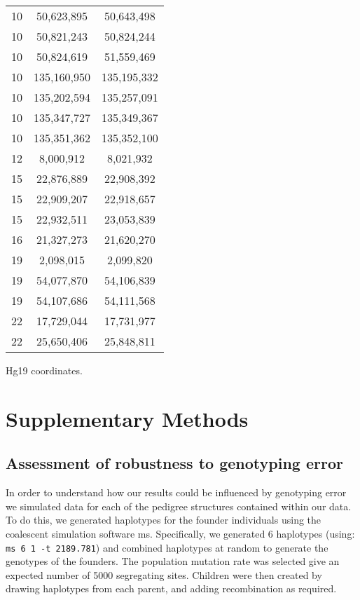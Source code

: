 \begin{table}[!h]
\begin{tabular}{|ccc|}
10 & 50,623,895 & 50,643,498 \\
10 & 50,821,243 & 50,824,244 \\
10 & 50,824,619 & 51,559,469 \\
10 & 135,160,950 & 135,195,332 \\
10 & 135,202,594 & 135,257,091 \\
10 & 135,347,727 & 135,349,367 \\
10 & 135,351,362 & 135,352,100 \\
12 & 8,000,912 & 8,021,932 \\
15 & 22,876,889 & 22,908,392 \\
15 & 22,909,207 & 22,918,657 \\
15 & 22,932,511 & 23,053,839 \\
16 & 21,327,273 & 21,620,270 \\
19 & 2,098,015 & 2,099,820 \\
19 & 54,077,870 & 54,106,839 \\
19 & 54,107,686 & 54,111,568 \\
22 & 17,729,044 & 17,731,977 \\
22 & 25,650,406 & 25,848,811 \\
    \hline \end{tabular}
     {
            Hg19 coordinates.  
    \label{tab:cointTS8}}
\end{table}

\clearpage

\section{Supplementary Methods}

\subsection{Assessment of robustness to genotyping error}

In order to understand how our results could be influenced by genotyping  
error we simulated data for each of the pedigree structures contained within our  
data.  To do this, we generated haplotypes for the founder individuals using the  
coalescent simulation software ms\cite{Hudson2002}.  Specifically, we generated 6 haplotypes (using:  
\verb|ms 6 1 -t 2189.781|) and combined haplotypes at random to generate the genotypes  
of the founders.  The population mutation rate was selected give an expected  
number of 5000 segregating sites. Children were then created by drawing  
haplotypes from each parent, and adding recombination as required.   

